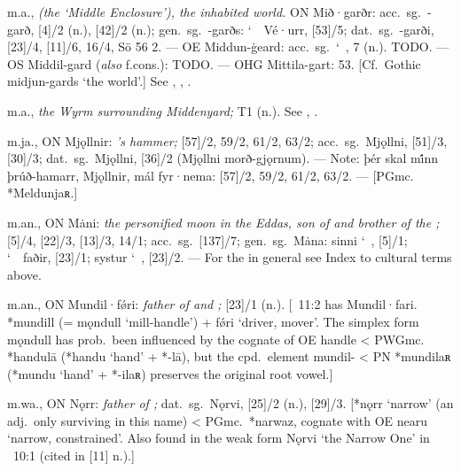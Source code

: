\begin{itemize}
 m.a.,
  \emph{(the ‘Middle Enclosure’), the inhabited world.}
  ON Mið·garðr: acc.~sg.~-garð, [4]/2 (n.), [42]/2 (n.); gen.~sg.~-garðs: \char`~\ Vé·urr, [53]/5; dat.~sg.~-garði, [23]/4, [11]/6, 16/4, Sö 56 2.
  --- OE Middun-ġeard: acc.~sg.~\char`~,  7 (n.).  TODO.
  --- OS Middil-gard (\emph{also} f.cons.): TODO.
  --- OHG Mittila-gart:  53.
  [Cf.~Gothic midjun-gards ‘the world’.]
  See , , .

 m.a.,
  \emph{the Wyrm surrounding Middenyard;}  T1 (n.).
  See , .

 m.ja., ON Mjǫllnir:
  \emph{’s hammer;} [57]/2, 59/2, 61/2, 63/2; acc.~sg.~Mjǫllni, [51]/3, [30]/3; dat.~sg.~Mjǫllni, [36]/2 (Mjǫllni morð-gjǫrnum).
  --- Note: þér skal mi̇́nn þrúð-hamarr, Mjǫllnir, mál fyr·nema: [57]/2, 59/2, 61/2, 63/2.
  --- [PGmc. *Meldunjaʀ.]

 m.an., ON Mȧni:
  \emph{the personified moon in the Eddas, son of  and brother of the ;}
  [5]/4, [22]/3, [13]/3, 14/1; acc.~sg.~[137]/7; gen.~sg.~Mȧna: sinni \char`~, [5]/1; \char`~\ faðir, [23]/1; systur \char`~, [23]/2. ---
  For the  in general see Index to cultural terms above.

 m.an., ON Mundil·fǿri:
  \emph{father of  and ;} [23]/1 (n.).  [\Gylfaginning~11:2 has Mundil·fari.  *mundill (= mǫndull ‘mill-handle’) + fǿri ‘driver, mover’.  The simplex form mǫndull has prob.~been influenced by the cognate of OE handle < PWGmc. *handulā (*handu ‘hand’ + *-lā), but the cpd.~element mundil- < PN *mundilaʀ (*mundu ‘hand’ + *-ilaʀ) preserves the original root vowel.]

 m.wa., ON Nǫrr:
  \emph{father of ;} dat.~sg.~Nǫrvi, [25]/2 (n.), [29]/3. [*nǫrr ‘narrow’ (an adj.~only surviving in this name) < PGmc.~*narwaz, cognate with OE nearu ‘narrow, constrained’.  Also found in the weak form Nǫrvi ‘the Narrow One’ in \Gylfaginning~10:1 (cited in [11] n.).]


\end{itemize}
